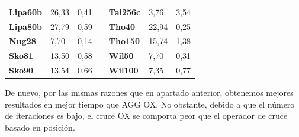 \documentclass[a4paper, 12pt]{article}
\begin{document}
\begin{table}[H]
\begin{tabular}{|l|l|l|l|l|l|l|}
\textbf{Lipa60b}                    & 26,33                              & 0,41                                 &                                & \textbf{Tai256c}                   & 3,76                               & 3,54                                 \\ \cline{1-3} \cline{5-7} 
\textbf{Lipa80b}                    & 27,79                              & 0,59                                 &                                & \textbf{Tho40}                     & 22,94                              & 0,25                                 \\ \cline{1-3} \cline{5-7} 
\textbf{Nug28}                      & 7,70                               & 0,14                                 &                                & \textbf{Tho150}                    & 15,74                              & 1,38                                 \\ \cline{1-3} \cline{5-7} 
\textbf{Sko81}                      & 13,50                              & 0,58                                 &                                & \textbf{Wil50}                     & 7,70                               & 0,31                                 \\ \cline{1-3} \cline{5-7} 
\textbf{Sko90}                      & 13,54                              & 0,66                                 &                                & \textbf{Wil100}                    & 7,35                               & 0,77                                 \\ \cline{1-3} \cline{5-7} 
\end{tabular}
\end{table}

De nuevo, por las mismas razones que en apartado anterior, obtenemos mejores resultados en mejor tiempo que AGG OX. No obstante, debido a que el número de iteraciones es bajo, el cruce OX se comporta peor que el operador de cruce basado en posición.
\end{document}
